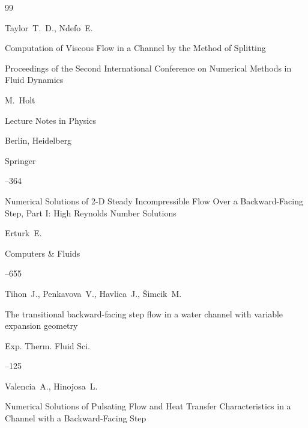 \begin{thebibliography}{99}




\by Taylor~T.~D., Ndefo~E.

\paper Computation of Viscous Flow in a Channel by the Method of Splitting

\inbook Proceedings of the Second International Conference on Numerical Methods in Fluid Dynamics


\ed M.~Holt 

\serial Lecture Notes in Physics

\publaddr Berlin, Heidelberg

\publ Springer


--364





\paper Numerical Solutions of 2-D Steady Incompressible Flow Over a Backward-Facing Step, Part I: High Reynolds Number Solutions

\by Erturk~E.

\jour Computers \& Fluids




--655





\by Tihon~J., Penkavova~V., Havlica~J., \v{S}imcik~M.

\paper The transitional backward-facing step flow in a water channel with variable expansion geometry

\jour Exp. Therm. Fluid Sci.



--125





\by Valencia~A., Hinojosa~L.

\paper Numerical Solutions of Pulsating Flow and Heat Transfer Characteristics in a Channel with a Backward-Facing Step


\end{thebibliography}
